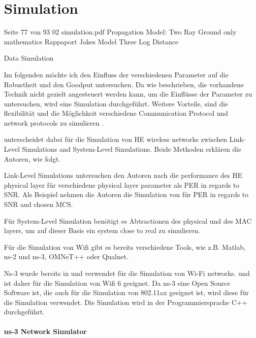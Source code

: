 \documentclass[]{nsm-thesis}
\begin{document}
\chapter{Simulation}
Seite 77 von 93 02 simulation.pdf
Propagation Model:
 Two Ray Ground only mathematics Rappaport
 Jakes Model
 Three Log Distance
 
 
 Data Simulation
 
 
 

Im folgenden möchte ich den Einfluss der verschiedenen Parameter auf die Robustheit und den Goodput untersuchen. Da wie beschrieben, die vorhandene Technik nicht
gezielt angesteuert werden kann, um die Einflüsse der Parameter zu untersuchen, wird eine Simulation durchgeführt. Weitere Vorteile, sind die flexibilität und die
Möglichkeit verschiedene Communication Protocol und network protocols zu simulieren \cite{ComparativeStudyKumar}.

\textcite{OmarHESurvey} unterscheidet dabei für die Simulation von HE wireless networks zwischen Link-Level Simulations and System-Level Simulations. Beide Methoden erklären die Autoren, wie folgt.

Link-Level Simulations untersuchen den Autoren nach die performance des HE physical layer für verschiedene physical layer parameter als \ac{PER} in regards to \ac{SNR}. Als Beispiel nehmen die Autoren die Simulation von \textcite{201} für PER in regards to SNR and chosen MCS.

Für System-Level Simulation benötigt es Abtractionen des physical und des MAC layers, um auf dieser Basis ein system close to real zu simulieren.

Für die Simulation von Wifi gibt es bereits verschiedene Tools, wie z.B. Matlab, ns-2 und ns-3, OMNeT++ oder Qualnet.

\cite{SimulationWifiMesh}
Ns-3 wurde bereits in \cite{ComparativeStudyKumar} und \cite{SimulationWifiMesh} verwendet für die Simulation von Wi-Fi networks. \textcite{} und ist daher für die Simulation von Wifi 6 geeignet.
Da ns-3 eine Open Source Software ist, die auch für die
Simulation von 802.11ax geeignet ist, wird diese für die Simulation verwendet. Die Simulation wird in der Programmiersprache C++ durchgeführt.


 
\subsubsection*{ns-3 Network Simulator}
\end{document}
